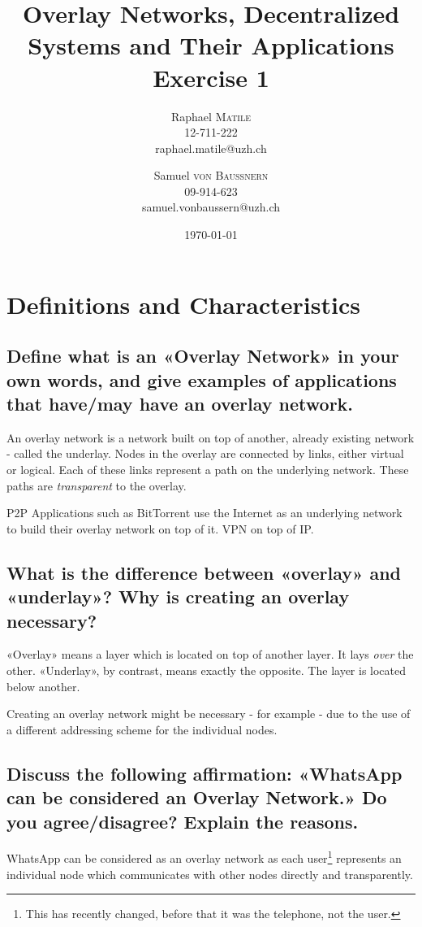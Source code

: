 \documentclass{article}
\title{Overlay Networks, Decentralized Systems and Their Applications
\\Exercise 1}
\author{Raphael \textsc{Matile}\\12-711-222\\raphael.matile@uzh.ch
\and Samuel \textsc{von Baussnern}\\09-914-623\\samuel.vonbaussern@uzh.ch}
\date{\today} %
\begin{document}
\maketitle %

\section{Definitions and Characteristics}

\subsection{Define what is an «Overlay Network» in your own words, and give
examples of applications that have/may have an overlay network.}

An overlay network is a network built on top of another, already existing
network - called the underlay. Nodes in the overlay are connected by links,
either virtual or logical. Each of these links represent a path on the
underlying network. These paths are \textit{transparent} to the overlay.

P2P Applications such as BitTorrent use the Internet as an underlying network to
build their overlay network on top of it. VPN on top of IP.

\subsection{What is the difference between «overlay» and «underlay»? Why is
creating an overlay necessary?}

«Overlay» means a layer which is located on top of another layer. It lays
\textit{over} the other. «Underlay», by contrast, means exactly the opposite.
The layer is located below another.

Creating an overlay network might be necessary - for example - due to the use of
a different addressing scheme for the individual nodes.

\subsection{Discuss the following affirmation: «WhatsApp can be considered an
Overlay Network.» Do you agree/disagree? Explain the reasons.}

WhatsApp can be considered as an overlay network as each user\footnote{This
has recently changed, before that it was the telephone, not the user.}
represents an individual node which communicates with other nodes directly and
transparently.
\end{document}
